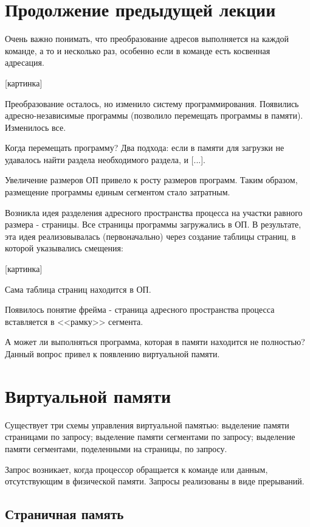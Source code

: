 \documentclass[a4paper, 14pt]{extreport}
\begin{document}
	\chapter{Продолжение предыдущей лекции}
	
	Очень важно понимать, что преобразование адресов выполняется на каждой команде, а то и несколько раз, особенно если в команде есть косвенная адресация.
	
	[картинка]
	
	Преобразование осталось, но изменило систему программирования. Появились адресно-независимые программы (позволило перемещать программы в памяти). Изменилось все.
	
	Когда перемещать программу? Два подхода: если в памяти для загрузки не удавалось найти раздела необходимого раздела, и [...].
	
	Увеличение размеров ОП привело к росту размеров программ. Таким образом, размещение программы единым сегментом стало затратным.
	
	Возникла идея разделения адресного пространства процесса на участки равного размера - страницы. Все страницы программы загружались в ОП. В результате, эта идея реализовывалась (первоначально) через создание таблицы страниц, в которой указывались смещения:
	
	[картинка]
	
	Сама таблица страниц находится в ОП.
	
	Появилось понятие фрейма - страница адресного пространства процесса вставляется в <<рамку>> сегмента.
	
	А может ли выполняться программа, которая в памяти находится не полностью? Данный вопрос привел к появлению виртуальной памяти.
	
	\chapter{Виртуальной памяти}
	
	Существует три схемы управления виртуальной памятью: выделение памяти страницами по запросу; выделение памяти сегментами по запросу; выделение памяти сегментами, поделенными на страницы, по запросу.
	
	Запрос возникает, когда процессор обращается к команде или данным, отсутствующим в физической памяти. Запросы реализованы в виде прерываний.
	
	\section{Страничная память}
	
\end{document}
